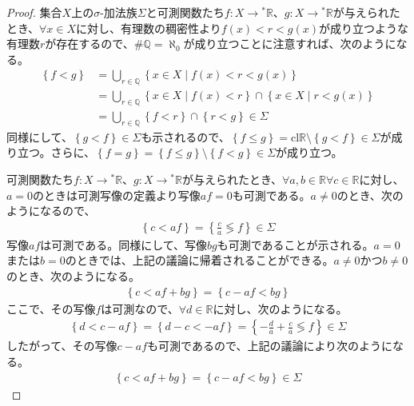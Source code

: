 \documentclass[dvipdfmx]{jsarticle}
\begin{document}
\begin{proof}
集合$X$上の$\sigma$-加法族$\varSigma$と可測関数たち$f:X \rightarrow{}^{*}\mathbb{R}$、$g:X \rightarrow{}^{*}\mathbb{R}$が与えられたとき、$\forall x \in X$に対し、有理数の稠密性より$f(x) < r < g(x)$が成り立つような有理数$r$が存在するので、$\#\mathbb{Q} = \aleph_{0}$が成り立つことに注意すれば、次のようになる。
\begin{align*}
\left\{ f < g \right\} &= \bigcup_{r \in \mathbb{Q}} \left\{ x \in X \middle| f(x) < r < g(x) \right\}\\
&= \bigcup_{r \in \mathbb{Q}} {\left\{ x \in X \middle| f(x) < r \right\} \cap \left\{ x \in X \middle| r < g(x) \right\}}\\
&= \bigcup_{r \in \mathbb{Q}} {\left\{ f < r \right\} \cap \left\{ r < g \right\}} \in \varSigma
\end{align*}
同様にして、$\left\{ g < f \right\} \in \varSigma$も示されるので、$\left\{ f \leq g \right\} = \mathrm{cl}\mathbb{R} \setminus \left\{ g < f \right\} \in \varSigma$が成り立つ。さらに、$\left\{ f = g \right\} = \left\{ f \leq g \right\} \setminus \left\{ f < g \right\} \in \varSigma$が成り立つ。\par
可測関数たち$f:X \rightarrow{}^{*}\mathbb{R}$、$g:X \rightarrow{}^{*}\mathbb{R}$が与えられたとき、$\forall a,b \in \mathbb{R}\forall c \in \mathbb{R}$に対し、$a = 0$のときは可測写像の定義より写像$af = 0$も可測である。$a \neq 0$のとき、次のようになるので、
\begin{align*}
\left\{ c < af \right\} = \left\{ \frac{c}{a} \lessgtr f \right\} \in \varSigma
\end{align*}
写像$af$は可測である。同様にして、写像$bg$も可測であることが示される。$a = 0$または$b = 0$のときでは、上記の議論に帰着されることができる。$a \neq 0$かつ$b \neq 0$のとき、次のようになる。
\begin{align*}
\left\{ c < af + bg \right\} = \left\{ c - af < bg \right\}
\end{align*}
ここで、その写像$f$は可測なので、$\forall d \in \mathbb{R}$に対し、次のようになる。
\begin{align*}
\left\{ d < c - af \right\} = \left\{ d - c < - af \right\} = \left\{ - \frac{d}{a} + \frac{c}{a} \lessgtr f \right\} \in \varSigma
\end{align*}
したがって、その写像$c - af$も可測であるので、上記の議論により次のようになる。
\begin{align*}
\left\{ c < af + bg \right\} = \left\{ c - af < bg \right\} \in \varSigma
\end{align*}\par

\end{proof}
\end{document}
